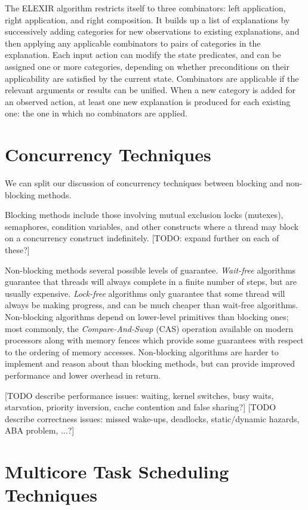 The ELEXIR algorithm restricts itself to three combinators: left application, right application, and right composition. It builds up a list of explanations by successively adding categories for new observations to existing explanations, and then applying any applicable combinators to pairs of categories in the explanation. Each input action can modify the state predicates, and can be assigned one or more categories, depending on whether preconditions on their applicability are satisfied by the current state. Combinators are applicable if the relevant arguments or results can be unified. When a new category is added for an observed action, at least one new explanation is produced for each existing one: the one in which no combinators are applied.

\section{Concurrency Techniques}

We can split our discussion of concurrency techniques between blocking and non-blocking methods.

Blocking methods include those involving mutual exclusion locks (mutexes), semaphores, condition variables, and other constructs where a thread may block on a concurrency construct indefinitely. [TODO: expand further on each of these?]

Non-blocking methods several possible levels of guarantee. \emph{Wait-free} algorithms guarantee that threads will always complete in a finite number of steps, but are usually expensive. \emph{Lock-free} algorithms only guarantee that some thread will always be making progress, and can be much cheaper than wait-free algorithms. Non-blocking algorithms depend on lower-level primitives than blocking ones; most commonly, the \emph{Compare-And-Swap} (CAS) operation available on modern processors along with memory fences which provide some guarantees with respect to the ordering of memory accesses. Non-blocking algorithms are harder to implement and reason about than blocking methods, but can provide improved performance and lower overhead in return.

[TODO describe performance issues: waiting, kernel switches, busy waits, starvation, priority inversion, cache contention and false sharing?]
[TODO describe correctness issues: missed wake-ups, deadlocks, static/dynamic hazards, ABA problem, ...?]

\section{Multicore Task Scheduling Techniques}

